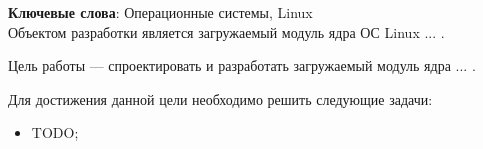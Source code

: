 \begin{essay}{}
    \noindent\textbf{Ключевые слова}: Операционные системы, Linux\\

    Объектом разработки является загружаемый модуль ядра ОС Linux ... .

    Цель работы --- спроектировать и разработать загружаемый модуль ядра ... .

    Для достижения данной цели необходимо решить следующие задачи:

    \begin{itemize}
        \item TODO;
    \end{itemize}


\end{essay}
